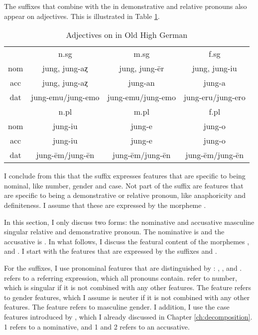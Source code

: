 The suffixes that combine with the  in demonstrative and relative pronouns also appear on adjectives. This is illustrated in Table \ref{tbl:adj-ohg}.

\begin{table}[H]\label{tbl:adj-ohg}
 \center
 \caption {Adjectives on  in Old High German }
  \begin{tabular}{cccc}
  \toprule
            & \ac{n}.\ac{sg}    & \ac{m}.\ac{sg}      & \ac{f}.\ac{sg}    \\
    \cmidrule{2-4}
  \ac{nom}  & jung, jung-aȥ     & jung, jung-ēr       & jung, jung-iu     \\
  \ac{acc}  & jung, jung-aȥ     & jung-an             & jung-a            \\
  \ac{dat}  & jung-emu/jung-emo & jung-emu/jung-emo   & jung-eru/jung-ero \\
  \bottomrule
            & \ac{n}.\ac{pl}    & \ac{m}.\ac{pl}      &  \ac{f}.\ac{pl}   \\
      \cmidrule{2-4}
  \ac{nom}  & jung-iu           &  jung-e             & jung-o            \\
  \ac{acc}  & jung-iu           &  jung-e             & jung-o            \\
  \ac{dat}  & jung-ēm/jung-ēn   &  jung-ēm/jung-ēn    & jung-ēm/jung-ēn   \\
    \bottomrule
  \end{tabular}
\end{table}

I conclude from this that the suffix expresses features that are specific to being nominal, like number, gender and case. Not part of the suffix are features that are specific to being a demonstrative or relative pronoun, like anaphoricity and definiteness. I assume that these are expressed by the morpheme .

In this section, I only discuss two forms: the nominative and accusative masculine singular relative and demonstrative pronoun. The nominative is  and the accusative is . In what follows, I discuss the featural content of the morphemes ,  and . I start with the features that are expressed by the suffixes  and .

For the suffixes, I use pronominal features that are distinguished by \citet{harley2002}: , ,  and .  refers to a referring expression, which all pronouns contain.  refer to number, which is singular if it is not combined with any other features. The feature  refers to gender features, which I assume is neuter if it is not combined with any other features. The feature  refers to masculine gender. I addition, I use the case features introduced by \citet{caha2009}, which I already discussed in Chapter \ref{ch:decomposition}. 1 refers to a nominative, and 1 and 2 refers to an accusative.

